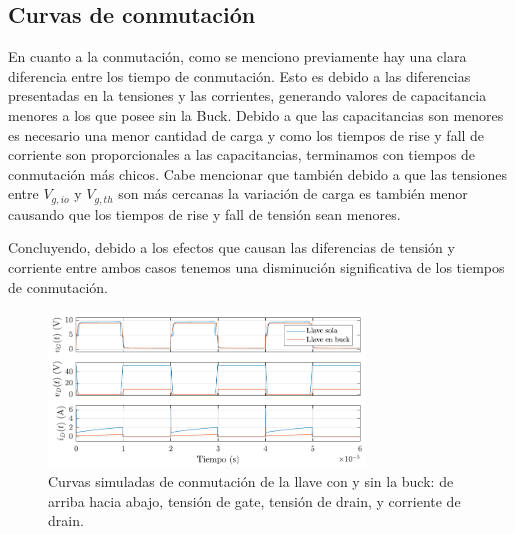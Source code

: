 \documentclass[e4_tp1_main.tex]{subfiles}
\begin{document}
\subsection{Curvas de conmutaci\'on}

En cuanto a la conmutación, como se menciono previamente hay una clara diferencia entre los tiempo de conmutación. Esto es debido a las diferencias presentadas en la tensiones y las corrientes, generando valores de capacitancia menores a los que posee sin la Buck. Debido a que las capacitancias son menores es necesario una menor cantidad de carga y como los tiempos de rise y fall de corriente son proporcionales a las capacitancias, terminamos con tiempos de conmutación más chicos. Cabe mencionar que también debido a que las  tensiones entre $V_{g,io}$ y $V_{g,th}$ son más cercanas la variación de carga es también menor causando que los tiempos de rise y fall de tensión sean menores. 

Concluyendo, debido a los efectos que causan las diferencias de tensión y corriente entre ambos casos tenemos una disminución significativa de los tiempos de conmutación.




	\begin{figure}[ht]
		\centering
		\includegraphics[width=0.75\textwidth]{images/ej3/conmutacion3.pdf}
		\caption{Curvas simuladas de conmutaci\'on de la llave con y sin la buck: de arriba hacia abajo, tensi\'on de gate, tensi\'on de drain, y corriente de drain.}
		\label{fig:curvas3}
	\end{figure}
\end{document}
